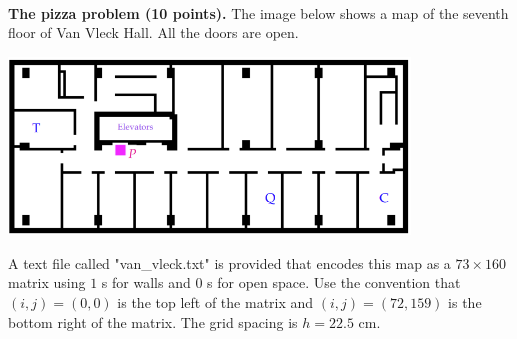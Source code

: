 \documentclass{article}
\begin{document}
\begin{problem} \\
    \textbf{The pizza problem (10 points).} The image below shows a map of the seventh floor of Van Vleck Hall. All the doors are open.
    \begin{center}
        \includegraphics[width=0.8\textwidth]{Q4ProblemStatement.png}
    \end{center}
    A text file called "van\_vleck.txt" is provided that encodes this map as a $73 \times 160$ matrix using $1$ s for walls and $0$ s for open space. Use the convention that $(i,j) =(0,0)$ is the top left of the matrix and $(i,j) = (72,159)$ is the bottom right of the matrix. The grid spacing is $h = 22.5$ cm.
    


\end{problem}
\end{document}

